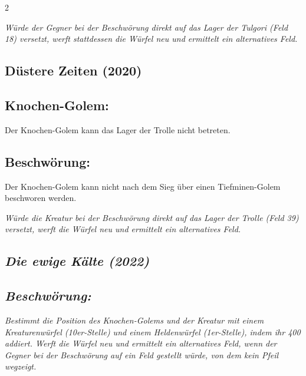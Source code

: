 \documentclass[10pt, a4paper, oneside]{book}
\newcommand{\fan}[1]{\textit{#1}}
\begin{document}
\begin{multicols*}{2}
\begin{bgcolor}[color-ag]
\fan{Würde der Gegner bei der Beschwörung direkt auf das Lager der Tulgori (Feld 18) versetzt, werft stattdessen die Würfel neu und ermittelt ein alternatives Feld.}

\end{bgcolor}


\begin{bgcolor}[color-dz]
\section{Düstere Zeiten (2020)}



\subsection{Knochen-Golem:}

Der Knochen-Golem kann das Lager der Trolle nicht betreten.
\supercite{dz-begleitheft}



\subsection{Beschwörung:}

Der Knochen-Golem kann nicht nach dem Sieg über einen Tiefminen-Golem beschworen werden.
\supercite{dz-begleitheft}

\fan{Würde die Kreatur bei der Beschwörung direkt auf das Lager der Trolle (Feld 39) versetzt, werft die Würfel neu und ermittelt ein alternatives Feld.}


\end{bgcolor}



\begin{bgcolor}
\section{\fan{Die ewige Kälte (2022)}}

\subsection{\fan{Beschwörung:}}

\fan{Bestimmt die Position des Knochen-Golems und der Kreatur mit einem Kreaturenwürfel (10er-Stelle) und einem Heldenwürfel (1er-Stelle), indem ihr 400 addiert. Werft die Würfel neu und ermittelt ein alternatives Feld, wenn der Gegner bei der Beschwörung auf ein Feld gestellt würde, von dem kein Pfeil wegzeigt.}



\end{bgcolor}
\end{multicols*}
\end{document}
